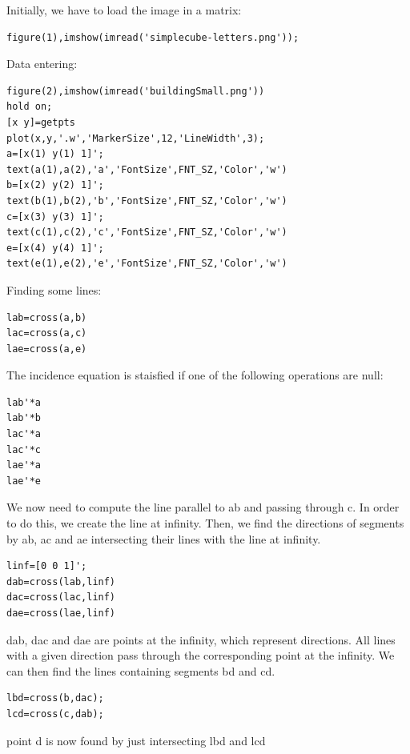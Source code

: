 \documentclass[12pt, a4paper]{report}
\newtheorem[style=M,bodystyle=\normalfont]{theorem}{Theorem}
\newtheorem[style=M,bodystyle=\normalfont]{corollary}{Corollary}
\newtheorem[style=M,bodystyle=\normalfont]{lemma}{Lemma}
\newtheorem[style=M,bodystyle=\normalfont]{definition}{Definition}
\begin{document}
    \begin{Answer}[ref=2]
        Initially, we have to load the image in a matrix: 
        \begin{lstlisting}[frame=single, numbers=none, style=Matlab-bw]
figure(1),imshow(imread('simplecube-letters.png'));
        \end{lstlisting}
        Data entering: 
        \begin{lstlisting}[frame=single, numbers=none, style=Matlab-bw]
figure(2),imshow(imread('buildingSmall.png'))
hold on;
[x y]=getpts
plot(x,y,'.w','MarkerSize',12,'LineWidth',3);
a=[x(1) y(1) 1]';
text(a(1),a(2),'a','FontSize',FNT_SZ,'Color','w')
b=[x(2) y(2) 1]';
text(b(1),b(2),'b','FontSize',FNT_SZ,'Color','w')
c=[x(3) y(3) 1]';
text(c(1),c(2),'c','FontSize',FNT_SZ,'Color','w')
e=[x(4) y(4) 1]';
text(e(1),e(2),'e','FontSize',FNT_SZ,'Color','w')
        \end{lstlisting}
        Finding some lines: 
        \begin{lstlisting}[frame=single, numbers=none, style=Matlab-bw]
lab=cross(a,b)
lac=cross(a,c)
lae=cross(a,e)
        \end{lstlisting}
        The incidence equation is staisfied if one of the following operations are null: 
        \begin{lstlisting}[frame=single, numbers=none, style=Matlab-bw]
lab'*a
lab'*b
lac'*a
lac'*c
lae'*a
lae'*e
        \end{lstlisting}  
        We now need to compute the line parallel to ab and passing through c. In order to do this, we create the line at infinity. 
        Then, we find the directions of segments by ab, ac and ae intersecting their lines with the line at infinity. 
        \begin{lstlisting}[frame=single, numbers=none, style=Matlab-bw]
linf=[0 0 1]';
dab=cross(lab,linf)
dac=cross(lac,linf)
dae=cross(lae,linf)
        \end{lstlisting}
        dab, dac and dae are points at the infinity, which represent directions. All lines with a given direction pass through the corresponding point at the infinity. 
        We can then find the lines containing segments bd and cd.
        \begin{lstlisting}[frame=single, numbers=none, style=Matlab-bw]
lbd=cross(b,dac);
lcd=cross(c,dab);
        \end{lstlisting}
        point d is now found by just intersecting lbd and lcd
        \begin{lstlisting}[frame=single, numbers=none, style=Matlab-bw]

\end{lstlisting}
\end{Answer}
\end{document}
